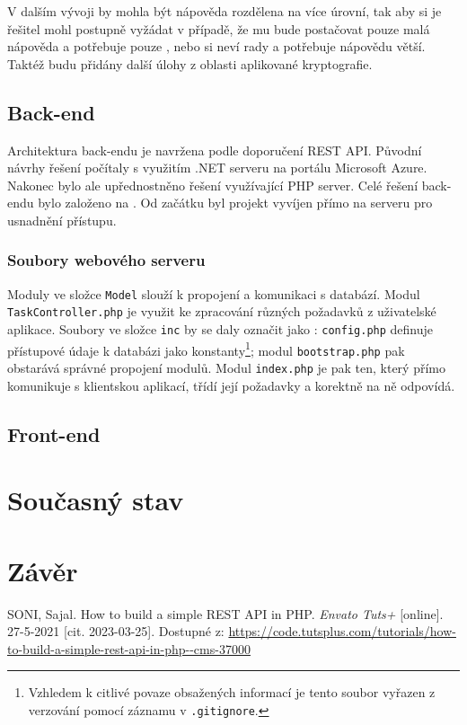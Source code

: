 \documentclass[titlepage]{article}
\begin{document}
V dalším vývoji by mohla být nápověda rozdělena na více úrovní, tak aby si je řešitel mohl postupně vyžádat v případě, že mu bude postačovat pouze malá nápověda a potřebuje pouze , nebo si neví rady a potřebuje nápovědu větší. Taktéž budu přidány další úlohy z oblasti aplikované kryptografie.   

\subsection{Back-end}
Architektura back-endu je navržena podle doporučení REST API. Původní návrhy řešení počítaly s využitím .NET serveru na portálu Microsoft Azure. Nakonec bylo ale upřednostněno řešení využívající PHP server. Celé řešení back-endu bylo založeno na \cite{restapi}. Od začátku byl projekt vyvíjen přímo na serveru pro usnadnění přístupu. 

\subsubsection{Soubory webového serveru}
\vspace{1em}
Moduly ve složce \texttt{Model} slouží k propojení a komunikaci s databází. Modul \texttt{Task\-Controller.php} je využit ke zpracování různých požadavků z uživatelské aplikace. Soubory ve složce \texttt{inc} by se daly označit jako : \texttt{config.php} definuje přístupové údaje k databázi jako konstanty\footnote{Vzhledem k citlivé povaze obsažených informací je tento soubor vyřazen z verzování pomocí záznamu v \texttt{.gitignore}.}; modul \texttt{boot\-strap.php} pak obstarává správné propojení modulů. Modul \texttt{index.php} je pak ten, který přímo komunikuje s klientskou aplikací, třídí její požadavky a korektně na ně odpovídá. 

\subsection{Front-end}

\section{Současný stav}

\section*{Závěr}

\begin{thebibliography}{9}
    SONI, Sajal. How to build a simple REST API in PHP. \emph{En\-va\-to Tuts+} [on\-li\-ne]. 27-5-2021 [cit. 2023-03-25]. Dostupné z: \url{https://code.tutsplus.com/tutorials/how-to-build-a-simple-rest-api-in-php--cms-37000}
\end{thebibliography}
\end{document}
